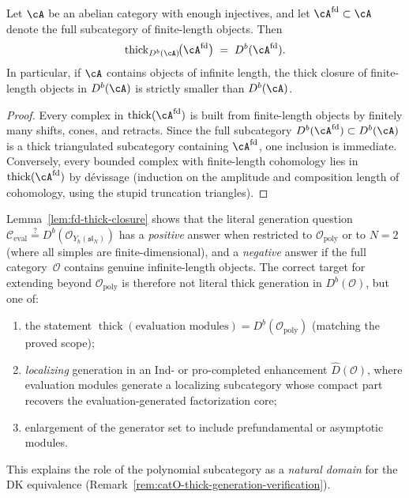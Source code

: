 \begin{lemma}
\label{lem:fd-thick-closure}
Let $\cA$ be an abelian category with enough injectives, and let
$\cA^{\mathrm{fd}} \subset \cA$ denote the full subcategory of
finite-length objects. Then
\[
\operatorname{thick}_{D^b(\cA)}\!\bigl(\cA^{\mathrm{fd}}\bigr)
\;=\; D^b(\cA^{\mathrm{fd}}).
\]
In particular, if $\cA$ contains objects of infinite length, the
thick closure of finite-length objects in $D^b(\cA)$ is strictly
smaller than $D^b(\cA)$.
\end{lemma}

\begin{proof}
Every complex in $\operatorname{thick}(\cA^{\mathrm{fd}})$ is built
from finite-length objects by finitely many shifts, cones, and
retracts. Since the full subcategory
$D^b(\cA^{\mathrm{fd}}) \subset D^b(\cA)$ is a thick triangulated
subcategory containing $\cA^{\mathrm{fd}}$, one inclusion is
immediate. Conversely, every bounded complex with finite-length
cohomology lies in $\operatorname{thick}(\cA^{\mathrm{fd}})$ by
d\'{e}vissage (induction on the amplitude and composition length of
cohomology, using the stupid truncation triangles).
\end{proof}

\begin{remark}
\label{rem:fd-thick-closure-implications}
Lemma~\ref{lem:fd-thick-closure} shows that the literal generation
question
$\mathcal{C}_{\mathrm{eval}} \stackrel{?}{=}
D^b(\mathcal{O}_{Y_\hbar(\mathfrak{sl}_N)})$
has a \emph{positive} answer when restricted to
$\mathcal{O}_{\mathrm{poly}}$ or to $N = 2$ (where all simples are
finite-dimensional), and a \emph{negative} answer if the full
category~$\mathcal{O}$ contains genuine infinite-length objects.
The correct target for extending beyond
$\mathcal{O}_{\mathrm{poly}}$ is therefore not literal thick
generation in $D^b(\mathcal{O})$, but one of:
\begin{enumerate}[label=\textup{(\alph*)}]
\item the statement
 $\operatorname{thick}(\text{evaluation modules}) =
 D^b(\mathcal{O}_{\mathrm{poly}})$
 (matching the proved scope);
\item \emph{localizing} generation in an Ind- or
 pro-completed enhancement
 $\widehat{D}(\mathcal{O})$,
 where evaluation modules generate a localizing
 subcategory whose compact part recovers the evaluation-generated
 factorization core;
\item enlargement of the generator set to include
 prefundamental or asymptotic modules.
\end{enumerate}
This explains the role of the polynomial subcategory as a
\emph{natural domain} for the DK equivalence
(Remark~\ref{rem:catO-thick-generation-verification}).
\end{remark}

